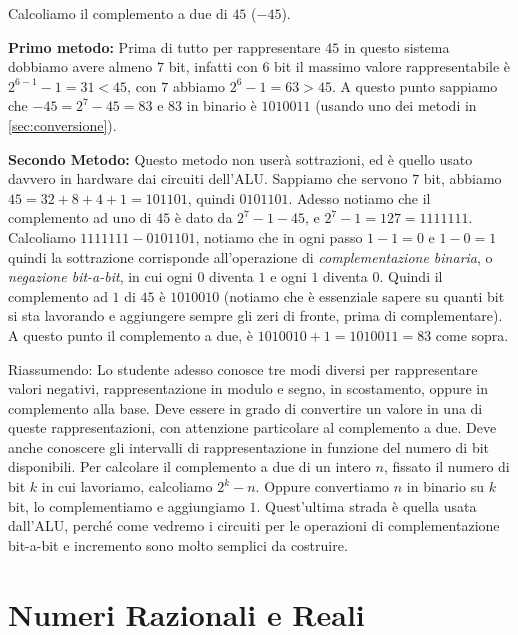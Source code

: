 \begin{ex} Calcoliamo il complemento a due di $45$ ($-45$).

\noindent \textbf{Primo metodo:} Prima di tutto per rappresentare $45$ in
questo sistema dobbiamo avere almeno $7$ bit, infatti con $6$ bit il massimo
valore rappresentabile è $2^{6-1}-1 = 31 < 45$, con $7$ abbiamo $2^6-1 =
63>45$. A questo punto sappiamo che $-45 = 2^7-45 = 83$ e $83$ in binario è
$1010011$ (usando uno dei metodi in \ref{sec:conversione}).\medskip

\noindent \textbf{Secondo Metodo:} Questo metodo non userà sottrazioni, ed è
quello usato davvero in hardware dai circuiti dell'ALU. Sappiamo che servono
$7$ bit, abbiamo $45 = 32+8+4+1 = 101101$, quindi $0101101$. Adesso notiamo che
il complemento ad uno di $45$ è dato da $2^7-1-45$, e $2^7-1 = 127 = 1111111$.
Calcoliamo $1111111-0101101$, notiamo che in ogni passo $1-1=0$ e $1-0=1$
quindi la sottrazione corrisponde all'operazione di \emph{complementazione
binaria}, o \emph{negazione bit-a-bit}, in cui ogni $0$ diventa $1$ e ogni $1$
diventa $0$. Quindi il complemento ad $1$ di $45$ è $1010010$ (notiamo che è
essenziale sapere su quanti bit si sta lavorando e aggiungere sempre gli zeri
di fronte, prima di complementare). A questo punto il complemento a due, è
$1010010+1 = 1010011 = 83$ come sopra. \end{ex}

Riassumendo: Lo studente adesso conosce tre modi diversi per rappresentare
valori negativi, rappresentazione in modulo e segno, in scostamento, oppure in
complemento alla base. Deve essere in grado di convertire un valore in una di
queste rappresentazioni, con attenzione particolare al complemento a due. Deve
anche conoscere gli intervalli di rappresentazione in funzione del numero di
bit disponibili. Per calcolare il complemento a due di un intero $n$, fissato
il numero di bit $k$ in cui lavoriamo, calcoliamo $2^k-n$. Oppure convertiamo
$n$ in binario su $k$ bit, lo complementiamo e aggiungiamo $1$. Quest'ultima
strada è quella usata dall'ALU, perché come vedremo i circuiti per le
operazioni di complementazione bit-a-bit e incremento sono molto semplici da
costruire.

\section{Numeri Razionali e Reali}

